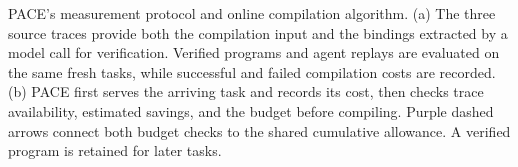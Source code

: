 \caption{PACE's measurement protocol and online compilation algorithm.
(a) The three source traces provide both the compilation input and the bindings extracted by a model call for verification.
Verified programs and agent replays are evaluated on the same fresh tasks, while successful and failed compilation costs are recorded.
(b) PACE first serves the arriving task and records its cost, then checks trace availability, estimated savings, and the budget before compiling.
Purple dashed arrows connect both budget checks to the shared cumulative allowance.
A verified program is retained for later tasks.}
